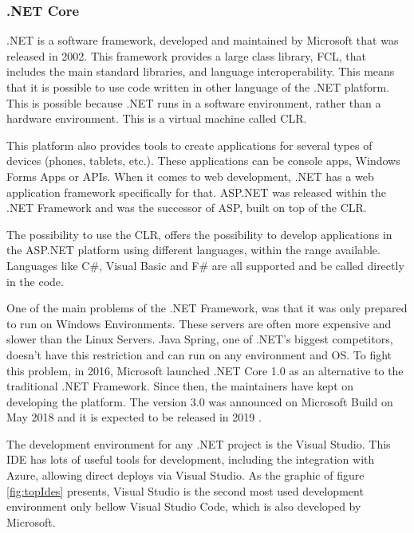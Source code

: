\subsubsection{.NET Core}
\label{sub:StateOfTheArt_Frameworks_NET}
.NET is a software framework, developed and maintained by Microsoft that was released in 2002. This framework provides a large class library, \gls{FCL}, that includes the main standard libraries, and language interoperability. This means that it is possible to use code written in other language of the .NET platform. This is possible because .NET runs in a software environment, rather than a hardware environment. This is a virtual machine called \gls{CLR}.
\par
This platform also provides tools to create applications for several types of devices (phones, tablets, etc.). These applications can be console apps, Windows Forms Apps or \glspl{API}. When it comes to web development, .NET has a web application framework specifically for that. ASP.NET was released within the .NET Framework and was the successor of \gls{ASP}, built on top of the \gls{CLR}.

\par
The possibility to use the \gls{CLR}, offers the possibility to develop applications in the ASP.NET platform using different languages, within the range available. Languages like C\#, Visual Basic and F\# are all supported and be called directly in the code. 
\par

One of the main problems of the .NET Framework, was that it was only prepared to run on Windows Environments. These servers are often more expensive and slower than the Linux Servers. Java Spring, one of .NET's biggest competitors, doesn't have this restriction and can run on any environment and \gls{OS}. To fight this problem, in 2016, Microsoft launched .NET Core 1.0 as an alternative to the traditional .NET Framework. Since then, the maintainers have kept on developing the platform. The version 3.0 was announced on Microsoft Build on May 2018 and it is expected to be released in 2019 \parencite{whatIsDotNet}.

\par
The development environment for any .NET project is the Visual Studio. This \gls{IDE} has lots of useful tools for development, including the integration with Azure, allowing direct deploys via Visual Studio. As the graphic of figure \ref{fig:topIdes} presents, Visual Studio is the second most used development environment only bellow Visual Studio Code, which is also developed by Microsoft.
\par


